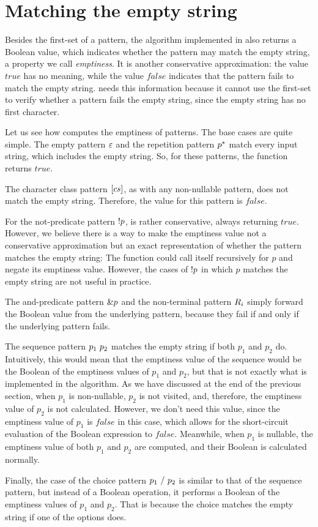 \section{Matching the empty string}

Besides the first-set of a pattern,
the algorithm implemented in \lpeg{} also returns
a Boolean value, which indicates whether the
pattern may match the empty string,
a property we call \emph{emptiness}.
It is another conservative approximation:
the value $true$ has no meaning,
while the value $false$ indicates that the pattern
fails to match the empty string.
\lpeg{} needs this information
because it cannot use the first-set
to verify whether a pattern fails the empty string,
since the empty string has no first character.

Let us see how \lpeg{} computes
the emptiness of patterns.
The base cases are quite simple.
The empty pattern $\varepsilon$ and
the repetition pattern $p^\star$
match every input string,
which includes the empty string.
So, for these patterns,
the function returns $true$.

The character class pattern $[cs]$,
as with any non-nullable pattern,
does not match the empty string.
Therefore, the value for this pattern is $false$.

For the not-predicate pattern $!p$,
\lpeg{} is rather conservative,
always returning $true$.
However, we believe there is a way
to make the emptiness value
not a conservative approximation
but an exact representation of whether
the pattern matches the empty string:
The function could call itself recursively for $p$
and negate its emptiness value.
However, the cases of $!p$
in which $p$ matches the empty string
are not useful in practice.

The and-predicate pattern $\&p$
and the non-terminal pattern $R_{i}$
simply forward the Boolean value
from the underlying pattern,
because they fail if and only if
the underlying pattern fails.

The sequence pattern $p_1\ p_2$
matches the empty string if
both $p_1$ and $p_2$ do.
Intuitively, this would mean that the emptiness value of the sequence
would be the Boolean \scand{} of the emptiness values of $p_1$ and $p_2$,
but that is not exactly what is implemented in the algorithm.
As we have discussed at the end of the previous section,
when $p_1$ is non-nullable, $p_2$ is not visited,
and, therefore, the emptiness value of $p_2$ is not calculated.
However, we don't need this value,
since the emptiness value of $p_1$ is $false$ in this case,
which allows for the short-circuit evaluation
of the Boolean \scand{} expression to $false$.
Meanwhile, when $p_1$ is nullable,
the emptiness value of both $p_1$ and $p_2$ are computed,
and their Boolean \scand{} is calculated normally.

Finally, the case of the choice pattern $p_1\ /\ p_2$
is similar to that of the sequence pattern,
but instead of a Boolean \scand{} operation,
it performs a Boolean \scor{}
of the emptiness values of $p_1$ and $p_2$.
That is because the choice matches the empty string
if one of the options does.